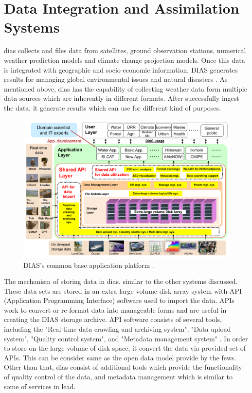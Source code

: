 \section{Data Integration and Assimilation Systems}
\label{se:dias}

\acrshort{dias} collects and files data from satellites, ground observation stations, numerical weather prediction models and climate change projection models. Once this data is integrated with geographic and socio-economic information, DIAS generates results for managing global environmental issues and natural disasters \cite{Kawasaki2018DataReduction}. As mentioned above, \acrshort{dias} has the capability of collecting weather data form multiple data sources which are inherently in different formats. After successfully ingest the data, it generate results which can use for different kind of purposes.

\begin{figure}[htp]
    \centering
    \includegraphics[width=1\textwidth]{lit/other/dias_common_base_application_platform.png}
    \caption[DIAS’s common base application platform.]{DIAS’s common base application platform \cite{Kawasaki2018DataReduction}.}
    \label{fi:dias_common_platform}
\end{figure}

The mechanism of storing data in \acrshort{dias}, similar to the other systems discussed.
These data sets are stored in an extra large volume disk array system with API (Application Programming Interface) software used to import the data. APIs work to convert or re-format data into manageable forms and are useful in creating the DIAS storage archive. API software consists of several tools, including the "Real-time data crawling and archiving system", "Data upload system", "Quality control system", and "Metadata management system" \cite{Kawasaki2018DataReduction}. In order to store on the large volume of disk space, it convert the data via provided set of APIs. This can be consider same as the open data model provide by the \acrshort{fews}. Other than that, \acrshort{dias} consist of additional tools which provide the functionality of quality control of the data, and metadata management which is similar to some of services in \acrshort{lead}.

